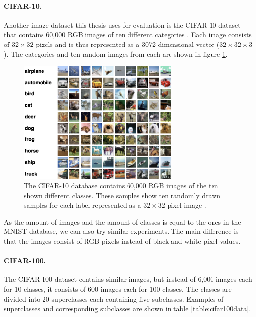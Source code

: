 \paragraph{CIFAR-10.} Another image dataset this thesis uses for evaluation is the CIFAR-10 dataset that contains 60,000 RGB images of ten different categories \cite{Krizhevsky2009LearningML}. Each image consists of $32 \times 32$ pixels and is thus represented as a 3072-dimensional vector ($32 \times 32 \times 3$). The categories and ten random images from each are shown in figure \ref{fig:cifar10}.

\begin{figure}[h]
    \centering
    \includegraphics[width=0.7\textwidth]{images/cifar10}
    \caption{The CIFAR-10 database contains 60,000 RGB images of the ten shown different classes. These samples show ten randomly drawn samples for each label represented as a $32 \times 32$ pixel image \cite{Krizhevsky2009LearningML}.}
    \label{fig:cifar10}
\end{figure}

As the amount of images and the amount of classes is equal to the ones in the MNIST database, we can also try similar experiments. The main difference is that the images consist of RGB pixels instead of black and white pixel values.

\paragraph{CIFAR-100.} The CIFAR-100 dataset contains similar images, but instead of 6,000 images each for 10 classes, it consists of 600 images each for 100 classes. The classes are divided into 20 superclasses each containing five subclasses. Examples of superclasses and corresponding subclasses are shown in table \ref{table:cifar100data}. 

